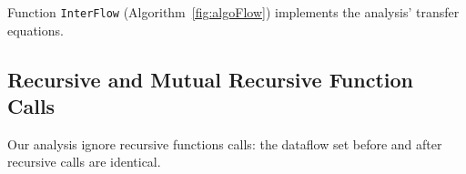 \begin{algorithm*}
\OutData{}
\end{algorithm*}
\DecMargin{1em}
Function \texttt{InterFlow} (Algorithm~\ref{fig:algoFlow})
implements the analysis' transfer equations.

\subsection{Recursive and Mutual Recursive Function Calls} 

Our analysis ignore recursive functions calls: the dataflow set
before and after recursive calls are identical. 

